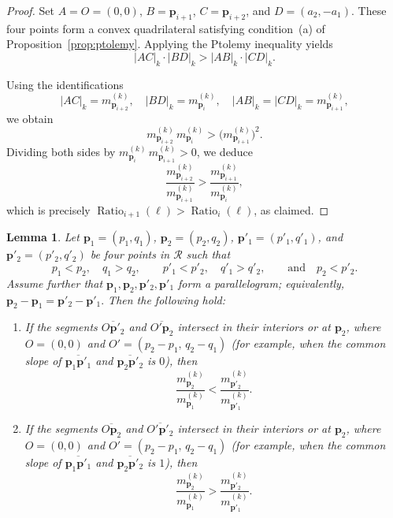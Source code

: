 \documentclass{article}
\newtheorem{lemma}[theorem]{Lemma}
\theoremstyle{remark}
\begin{document}
\begin{proof}
Set $A = O = (0,0)$, $B = \mathbf{p}_{i+1}$, $C = \mathbf{p}_{i+2}$, and $D = (a_2,-a_1)$.
These four points form a convex quadrilateral satisfying condition~(a) of Proposition~\ref{prop:ptolemy}. Applying the Ptolemy inequality yields
\[
|AC|_k \cdot |BD|_k > |AB|_k \cdot |CD|_k.
\]

Using the identifications
\[
|AC|_k = m^{(k)}_{\mathbf{p}_{i+2}}, \quad 
|BD|_k = m^{(k)}_{\mathbf{p}_i}, \quad 
|AB|_k = |CD|_k = m^{(k)}_{\mathbf{p}_{i+1}},
\]
we obtain
\[
m^{(k)}_{\mathbf{p}_{i+2}} \, m^{(k)}_{\mathbf{p}_i} > \bigl(m^{(k)}_{\mathbf{p}_{i+1}}\bigr)^2.
\]
Dividing both sides by $m^{(k)}_{\mathbf{p}_i} \, m^{(k)}_{\mathbf{p}_{i+1}} > 0$, we deduce
\[
\frac{m^{(k)}_{\mathbf{p}_{i+2}}}{m^{(k)}_{\mathbf{p}_{i+1}}} 
> 
\frac{m^{(k)}_{\mathbf{p}_{i+1}}}{m^{(k)}_{\mathbf{p}_{i}}},
\]
which is precisely $\operatorname{Ratio}_{i+1}(\ell) > \operatorname{Ratio}_{i}(\ell)$, as claimed.
\end{proof}


\begin{lemma}\label{lem:ratio_comparison}
Let $\mathbf{p}_1 = (p_1, q_1)$, $\mathbf{p}_2 = (p_2, q_2)$, 
$\mathbf{p}'_1 = (p'_1, q'_1)$, and $\mathbf{p}'_2 = (p'_2, q'_2)$
be four points in $\mathcal{R}$ such that
\[
p_1 < p_2,\quad q_1 > q_2,\qquad 
p'_1 < p'_2,\quad q'_1 > q'_2,\qquad \text{and}\quad p_2 < p'_2.
\]
Assume further that $\mathbf{p}_1, \mathbf{p}_2, \mathbf{p}'_2, \mathbf{p}'_1$ form a parallelogram; equivalently,
$\mathbf{p}_2 - \mathbf{p}_1 = \mathbf{p}'_2 - \mathbf{p}'_1.$
Then the following hold:

\begin{enumerate}
    \item[$(1)$] If the segments $\overline{O\mathbf{p}'_2}$ and $\overline{O'\mathbf{p}_2}$ intersect in their interiors or at $\mathbf p_2$, where $O = (0,0)$ and $O' = (p_2 - p_1,\, q_2 - q_1)$ (for example, when the common slope of $\overline{\mathbf{p}_1\mathbf{p}'_1}$ and $\overline{\mathbf{p}_2\mathbf{p}'_2}$ is $0$), then
    \[
        \frac{m^{(k)}_{\mathbf{p}_2}}{m^{(k)}_{\mathbf{p}_1}} 
        < 
        \frac{m^{(k)}_{\mathbf{p}'_2}}{m^{(k)}_{\mathbf{p}'_1}}.
    \]

    \item[$(2)$]  If the segments $\overline{O\mathbf{p}_2}$ and $\overline{O'\mathbf{p}'_2}$ intersect in their interiors or at $\mathbf p_2$, where $O = (0,0)$ and $O' = (p_2 - p_1,\, q_2 - q_1)$ (for example, when the common slope of $\overline{\mathbf{p}_1\mathbf{p}'_1}$ and $\overline{\mathbf{p}_2\mathbf{p}'_2}$ is $1$), then
    \[
        \frac{m^{(k)}_{\mathbf{p}_2}}{m^{(k)}_{\mathbf{p}_1}} 
        >
        \frac{m^{(k)}_{\mathbf{p}'_2}}{m^{(k)}_{\mathbf{p}'_1}}.
    \]
\end{enumerate}
\end{lemma}
\end{document}
